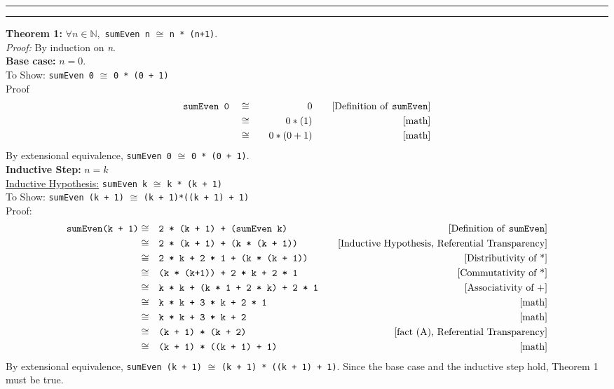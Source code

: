 \documentclass[11pt]{article}
\newcounter{questionCounter}
\newcounter{partCounter}[questionCounter]
\newenvironment{question}[2][\arabic{questionCounter}]{%
    \setcounter{partCounter}{0}%
    \vspace{.25in} \hrule \vspace{0.5em}%
        \noindent{\bf #2}%
    \vspace{0.8em} \hrule \vspace{.10in}%
    \addtocounter{questionCounter}{1}%
}{}
\begin{document}
\begin{question}{Task 4.1}
\textbf{Theorem 1:} $\forall n \in \mathbb{N},$ \verb!sumEven n! $\cong$ \verb!n * (n+1)!.\\
\emph{Proof:} By induction on \emph{n}.\\
\textbf{Base case:} $n = 0$.\\
To Show: \verb!sumEven 0! $\cong$ \verb!0 * (0 + 1)!\\
Proof
\begin{align*}
    \texttt{sumEven 0} & && \cong &&& 0 &&&& \text{[Definition of \texttt{sumEven}]}\\
                       & && \cong &&& 0 * (1) &&&& \text{[math]}\\
                       & && \cong &&& 0 * (0 + 1) &&&& \text{[math]}
\end{align*}
By extensional equivalence, \verb!sumEven 0! $\cong$ \verb!0 * (0 + 1)!.\\
\textbf{Inductive Step:} $n = k$\\
\underline{Inductive Hypothesis:} \verb!sumEven k! $\cong$ \verb!k * (k + 1)!\\
To Show: \verb!sumEven (k + 1)! $\cong$ \verb!(k + 1)*((k + 1) + 1)!\\
Proof:
\begin{align*}
    \texttt{sumEven(k + 1)} & \cong && \texttt{2 * (k + 1) + (sumEven k)} &&& \text{[Definition of \texttt{sumEven}]}\\
                            & \cong && \texttt{2 * (k + 1) + (k * (k + 1))} &&& \text{[Inductive Hypothesis, Referential Transparency]}\\
                            & \cong && \texttt{2 * k + 2 * 1 + (k * (k + 1))} &&& \text{[Distributivity of *]}\\
                            & \cong && \texttt{(k * (k+1)) + 2 * k + 2 * 1} &&& \text{[Commutativity of *]}\\
                            & \cong && \texttt{k * k + (k * 1 + 2 * k) + 2 * 1} &&& \text{[Associativity of +]}\\
                            & \cong && \texttt{k * k + 3 * k + 2 * 1} &&& \text{[math]}\\
                            & \cong && \texttt{k * k + 3 * k + 2} &&& \text{[math]}\\
                            & \cong && \texttt{(k + 1) * (k + 2)} &&& \text{[fact (A), Referential Transparency]}\\
                            & \cong && \texttt{(k + 1) * ((k + 1) + 1)} &&& \text{[math]}
\end{align*}
By extensional equivalence, \verb!sumEven (k + 1)! $\cong$ \verb!(k + 1) * ((k + 1) + 1)!. Since the base case and the inductive step hold, Theorem 1 must be true.
\end{question}
\end{document}
